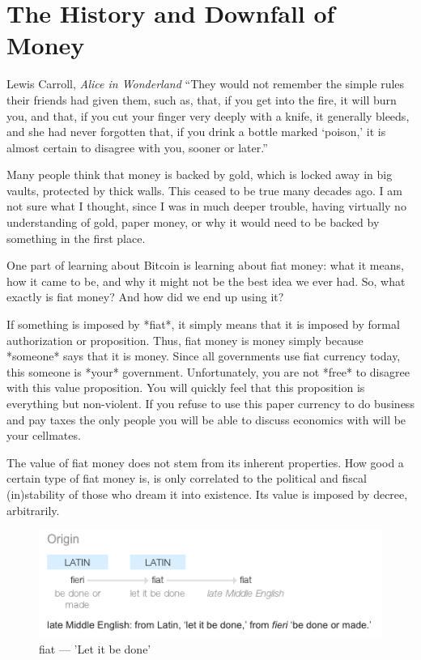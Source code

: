 \chapter{ The History and Downfall of Money}
\label{les:12}

\begin{chapquote}{Lewis Carroll, \textit{Alice in Wonderland}}
``They would not remember the simple rules their friends had given them, such
as, that, if you get into the fire, it will burn you, and that, if you cut your
finger very deeply with a knife, it generally bleeds, and she had never
forgotten that, if you drink a bottle marked `poison,' it is almost certain to
disagree with you, sooner or later.''
\end{chapquote}

Many people think that money is backed by gold, which is locked away in
big vaults, protected by thick
walls. This ceased to be true many decades ago. I am not sure what I
thought, since I was in much deeper trouble, having virtually no
understanding of gold, paper money, or why it would need to be backed by
something in the first place.

One part of learning about Bitcoin is learning about fiat money: what it
means, how it came to be, and why it might not be the best idea we ever
had. So, what exactly is fiat money? And how did we end up using it?

If something is imposed by *fiat*, it simply means that it is imposed by
formal authorization or proposition. Thus, fiat money is money simply
because *someone* says that it is money. Since all governments use fiat
currency today, this someone is *your* government. Unfortunately, you
are not *free* to disagree with this value proposition. You will quickly
feel that this proposition is everything but non-violent. If you refuse
to use this paper currency to do business and pay taxes the only people
you will be able to discuss economics with will be your cellmates.

The value of fiat money does not stem from its inherent properties. How
good a certain type of fiat money is, is only correlated to the
political and fiscal (in)stability of those who dream it into existence.
Its value is imposed by decree, arbitrarily.

\begin{figure}
  \includegraphics{assets/images/fiat-definition.png}
  \caption{fiat --- 'Let it be done'}
  \label{fig:fiat-definition}
\end{figure}

